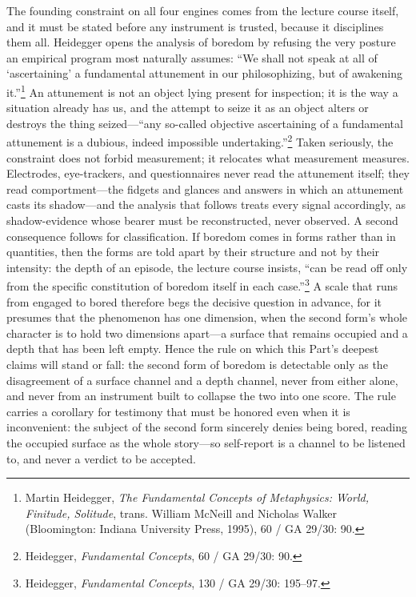 The founding constraint on all four engines comes from the lecture course itself, and it must be stated before any instrument is trusted, because it disciplines them all. Heidegger opens the analysis of boredom by refusing the very posture an empirical program most naturally assumes: ``We shall not speak at all of `ascertaining' a fundamental attunement in our philosophizing, but of awakening it.''\footnote{Martin Heidegger, \textit{The Fundamental Concepts of Metaphysics: World, Finitude, Solitude}, trans. William McNeill and Nicholas Walker (Bloomington: Indiana University Press, 1995), 60 / GA 29/30: 90.} An attunement is not an object lying present for inspection; it is the way a situation already has us, and the attempt to seize it as an object alters or destroys the thing seized---``any so-called objective ascertaining of a fundamental attunement is a dubious, indeed impossible undertaking.''\footnote{Heidegger, \textit{Fundamental Concepts}, 60 / GA 29/30: 90.} Taken seriously, the constraint does not forbid measurement; it relocates what measurement measures. Electrodes, eye-trackers, and questionnaires never read the attunement itself; they read comportment---the fidgets and glances and answers in which an attunement casts its shadow---and the analysis that follows treats every signal accordingly, as shadow-evidence whose bearer must be reconstructed, never observed. A second consequence follows for classification. If boredom comes in forms rather than in quantities, then the forms are told apart by their structure and not by their intensity: the depth of an episode, the lecture course insists, ``can be read off only from the specific constitution of boredom itself in each case.''\footnote{Heidegger, \textit{Fundamental Concepts}, 130 / GA 29/30: 195--97.} A scale that runs from engaged to bored therefore begs the decisive question in advance, for it presumes that the phenomenon has one dimension, when the second form's whole character is to hold two dimensions apart---a surface that remains occupied and a depth that has been left empty. Hence the rule on which this Part's deepest claims will stand or fall: the second form of boredom is detectable only as the disagreement of a surface channel and a depth channel, never from either alone, and never from an instrument built to collapse the two into one score. The rule carries a corollary for testimony that must be honored even when it is inconvenient: the subject of the second form sincerely denies being bored, reading the occupied surface as the whole story---so self-report is a channel to be listened to, and never a verdict to be accepted.

